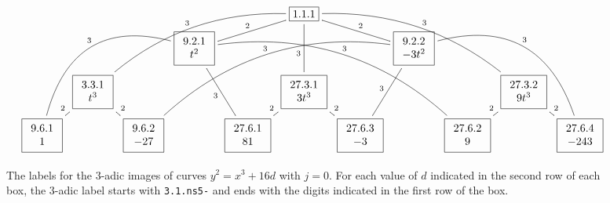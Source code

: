\documentclass[11pt]{amsart}
\theoremstyle{definition}
\begin{document}
\begin{figure}[ht]
{\tiny
$$
\xymatrix@R=1mm@C=1mm{ 
&       & &       &  & \fbox{1.1.1}\ar@{-}[dd]_3\ar@{-}[dll]_2\ar@{-}[drr]^2 \ar@/_2pc/@{-}[ddllll]_3 \ar@/^2pc/@{-}[ddrrrr]^3   & &       & & & \\
&       & & \fbox{$\begin{array}{c}9.2.1\\ t^2\end{array}$}\ar@/_4pc/@{-}[ddlll]_3\ar@{-}[ddr]_3\ar@/^3pc/@{-}[ddrrrrr]^3  &  &        & & \fbox{$\begin{array}{c} 9.2.2\\ -3 t^2\end{array}$}\ar@/^4pc/@{-}[ddrrr]^3\ar@{-}[ddl]_3\ar@/_3pc/@{-}[ddlllll]_3 & & & \\
&  \fbox{$\begin{array}{c}3.3.1\\ t^3\end{array}$}\ar@{-}[ld]_2\ar@{-}[rd]^2 & &       &  &  \fbox{$\begin{array}{c}27.3.1\\ 3t^3\end{array}$}\ar@{-}[ld]_2\ar@{-}[rd]^2 & &       & &  \fbox{$\begin{array}{c}27.3.2\\ 9t^3\end{array}$}\ar@{-}[ld]_2\ar@{-}[rd]^2 & \\
 \fbox{$\begin{array}{c}9.6.1\\ 1\end{array}$} & &  \fbox{$\begin{array}{c}9.6.2\\ -27\end{array}$} & &  \fbox{$\begin{array}{c}27.6.1\\ 81\end{array}$} & &  \fbox{$\begin{array}{c}27.6.3\\ -3\end{array}$} & &  \fbox{$\begin{array}{c}27.6.2\\ 9\end{array}$} & &  \fbox{$\begin{array}{c}27.6.4 \\ -243\end{array}$} 
}
$$
}
\caption{The labels for the $3$-adic images of curves $y^2=x^3+16d$ with $j=0$. For each value of $d$ indicated in the second row of each box, the $3$-adic label starts with \texttt{3.1.ns5-} and ends with the digits indicated in the first row of the box.}\label{fig-3ell3}
\end{figure}
\end{document}
